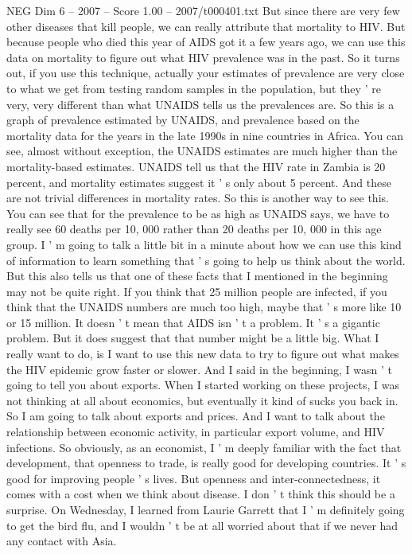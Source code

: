 \begin{textsample}{NEG Dim 6 – 2007 – Score 1.00 – 2007/t000401.txt}
But since there are very few other diseases that kill people, we can really attribute that mortality to HIV.
But because people who died this year of AIDS got it a few years ago, we can use this data on mortality to figure out what HIV prevalence was in the past.
So it turns out, if you use this technique, actually your estimates of prevalence are very close to what we get from testing random samples in the population, but they ' re very, very different than what UNAIDS tells us the prevalences are.
So this is a graph of prevalence estimated by UNAIDS, and prevalence based on the mortality data for the years in the late 1990s in nine countries in Africa.
You can see, almost without exception, the UNAIDS estimates are much higher than the mortality-based estimates.
UNAIDS tell us that the HIV rate in Zambia is 20 percent, and mortality estimates suggest it ' s only about 5 percent.
And these are not trivial differences in mortality rates.
So this is another way to see this.
You can see that for the prevalence to be as high as UNAIDS says, we have to really see 60 deaths per 10, 000 rather than 20 deaths per 10, 000 in this age group.
I ' m going to talk a little bit in a minute about how we can use this kind of information to learn something that ' s going to help us think about the world.
But this also tells us that one of these facts that I mentioned in the beginning may not be quite right.
If you think that 25 million people are infected, if you think that the UNAIDS numbers are much too high, maybe that ' s more like 10 or 15 million.
It doesn ' t mean that AIDS isn ' t a problem.
It ' s a gigantic problem.
But it does suggest that that number might be a little big.
What I really want to do, is I want to use this new data to try to figure out what makes the HIV epidemic grow faster or slower.
And I said in the beginning, I wasn ' t going to tell you about exports.
When I started working on these projects, I was not thinking at all about economics, but eventually it kind of sucks you back in.
So I am going to talk about exports and prices.
And I want to talk about the relationship between economic activity, in particular export volume, and HIV infections.
So obviously, as an economist, I ' m deeply familiar with the fact that development, that openness to trade, is really good for developing countries.
It ' s good for improving people ' s lives.
But openness and inter-connectedness, it comes with a cost when we think about disease.
I don ' t think this should be a surprise.
On Wednesday, I learned from Laurie Garrett that I ' m definitely going to get the bird flu, and I wouldn ' t be at all worried about that if we never had any contact with Asia.

\end{textsample}
